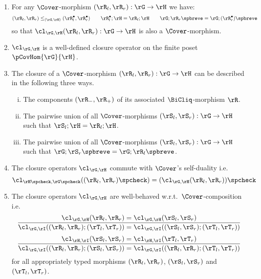 \documentclass{article}
\begin{document}
\begin{lemma}
\label{lem:cl_hom}
\item
\begin{enumerate}
\item
For any $\Cover$-morphism $(\rR_l,\rR_r) : \rG \to \rH$ we have:
\[
(\rR_l,\rR_r) \leq_{(\rG,\rH)} (\rR_l^\bullet,\rR_r^\bullet)
\qquad
\rR_l^\bullet ; \rH = \rR_l ; \rH
\qquad
\rG ; \rR_r\spbreve = \rG ; (\rR_r^\bullet)\spbreve
\]
so that $\cl_{\rG,\rH}(\rR_l,\rR_r) : \rG \to \rH$ is also a $\Cover$-morphism.

\item
$\cl_{\rG,\rH}$ is a well-defined closure operator on the finite poset $\pCovHom{\rG}{\rH}$.


\item

The closure of a $\Cover$-morphism $(\rR_l,\rR_r) : \rG \to \rH$ can be described in the following three ways.
\begin{enumerate}[i.]
\item
The components $(\rR_-,\rR_+)$ of its associated $\BiCliq$-morphism $\rR$.
\item
The pairwise union of all $\Cover$-morphisms $(\rS_l,\rS_r) : \rG \to \rH$ such that $\rS_l ; \rH = \rR_l ; \rH$.
\item
The pairwise union of all $\Cover$-morphisms $(\rS_l,\rS_r) : \rG \to \rH$ such that $\rG ; \rS_r\spbreve = \rG ; \rR_l\spbreve$.
\end{enumerate}


\item
The closure operators $\cl_{\rG,\rH}$ commute with $\Cover$'s self-duality i.e.\
\[
\cl_{\rH\spcheck,\rG\spcheck}((\rR_l,\rR_r)\spcheck)
=
(\cl_{\rG,\rH}(\rR_l,\rR_r))\spcheck
\]

\item
The closure operators $\cl_{\rG,\rH}$ are well-behaved w.r.t.\ $\Cover$-composition i.e.\
\[
\begin{tabular}{c}
$\dfrac{
\cl_{\rG,\rH}(\rR_l,\rR_r) = \cl_{\rG,\rH}(\rS_l,\rS_r)
}{
\cl_{\rG,\rI}((\rR_l,\rR_r) ; (\rT_l,\rT_r)) 
= \cl_{\rG,\rI}((\rS_l,\rS_r);(\rT_l,\rT_r))
}$
\\[3ex]
$\dfrac{
\cl_{\rH,\rI}(\rS_l,\rS_r) = \cl_{\rH,\rI}(\rT_l,\rT_r)
}{
\cl_{\rG,\rI}((\rR_l,\rR_r) ; (\rS_l,\rS_r)) = \cl_{\rG,\rI}((\rR_l,\rR_r) ; (\rT_l,\rT_r))
}$
\end{tabular}
\]
for all appropriately typed morphisms $(\rR_l,\rR_r)$, $(\rS_l,\rS_r)$ and $(\rT_l,\rT_r)$.

\end{enumerate}
\end{lemma}
\end{document}
